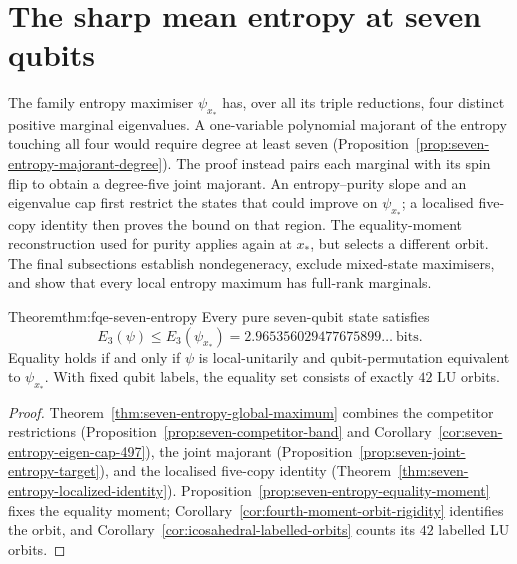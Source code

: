 \section{The sharp mean entropy at seven qubits}\label{sec:sup-seven-entropy}
The family entropy maximiser $\psi_{x_*}$ has, over all its triple
reductions, four distinct positive marginal eigenvalues. A one-variable polynomial majorant of the entropy
touching all four would require degree at least seven
(Proposition~\ref{prop:seven-entropy-majorant-degree}).
The proof instead pairs each marginal with its spin flip to obtain
a degree-five joint majorant. An entropy--purity slope and an eigenvalue
cap first restrict the states that could improve on $\psi_{x_*}$;
a localised five-copy identity then proves the bound on that region.
The equality-moment reconstruction used for purity applies again at
$x_*$, but selects a different orbit. The final subsections establish
nondegeneracy, exclude mixed-state maximisers, and show that every local
entropy maximum has full-rank marginals.







\begin{restated}{Theorem}{thm:fqe-seven-entropy}
Every pure seven-qubit state satisfies
\[
 E_3(\psi)\le E_3(\psi_{x_*})=2.965356029477675899\ldots\ \text{bits}.
\]
Equality holds if and only if $\psi$ is local-unitarily and qubit-permutation equivalent to $\psi_{x_*}$.
With fixed qubit labels, the equality set consists of exactly $42$ LU orbits.
\end{restated}
\begin{proof}
Theorem~\ref{thm:seven-entropy-global-maximum} combines the
competitor restrictions
(Proposition~\ref{prop:seven-competitor-band} and
Corollary~\ref{cor:seven-entropy-eigen-cap-497}),
the joint majorant (Proposition~\ref{prop:seven-joint-entropy-target}),
and the localised five-copy identity
(Theorem~\ref{thm:seven-entropy-localized-identity}).
Proposition~\ref{prop:seven-entropy-equality-moment} fixes the equality
moment; Corollary~\ref{cor:fourth-moment-orbit-rigidity}
identifies the orbit, and Corollary~\ref{cor:icosahedral-labelled-orbits}
counts its $42$ labelled LU orbits.
\end{proof}



